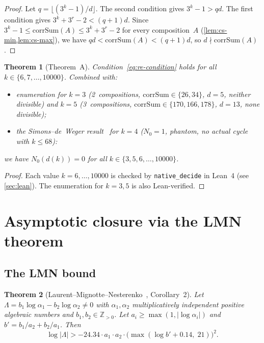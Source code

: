 \documentclass[11pt, a4paper]{amsart}
\theoremstyle{plain}
\newtheorem{theorem}{Theorem}[section]
\theoremstyle{definition}
\theoremstyle{remark}
\newcommand{\Z}{\mathbb{Z}}
\newcommand{\corrSum}{\mathrm{corrSum}}
\begin{document}
\begin{proof}
  Let $q = \lfloor (3^k - 1)/d \rfloor$.
  The second condition gives $3^k - 1 > qd$.
  The first condition gives $3^k + 3^r - 2 < (q+1)d$.
  Since $3^k - 1 \leq \corrSum(A) \leq 3^k + 3^r - 2$
  for every composition~$A$
  (\cref{lem:cs-min,lem:cs-max}), we have
  $qd < \corrSum(A) < (q+1)d$, so $d \nmid \corrSum(A)$.
\end{proof}

\begin{theorem}[Theorem~A]\label{thm:finite}
  Condition~\eqref{eq:re-condition} holds for all
  $k \in \{6, 7, \ldots, 10000\}$.
  Combined with:
  \begin{itemize}
    \item enumeration for $k = 3$ (2~compositions,
      $\corrSum \in \{26, 34\}$, $d = 5$, neither
      divisible) and $k = 5$ (3~compositions,
      $\corrSum \in \{170, 166, 178\}$, $d = 13$,
      none divisible);
    \item the Simons--de~Weger result~\cite{SimonsDeWeger2005}
      for $k = 4$ ($N_0 = 1$, phantom, no actual cycle
      with $k \leq 68$):
  \end{itemize}
  we have $N_0(d(k)) = 0$ for all
  $k \in \{3, 5, 6, \ldots, 10000\}$.
\end{theorem}

\begin{proof}
  Each value $k = 6, \ldots, 10000$ is checked by
  \texttt{native\_decide} in Lean~4 (see \cref{sec:lean}).
  The enumeration for $k = 3, 5$ is also Lean-verified.
\end{proof}

\section{Asymptotic closure via the LMN theorem}\label{sec:baker}

\subsection{The LMN bound}\label{ssec:lmn}

\begin{theorem}[Laurent--Mignotte--Nesterenko~\cite{LMN1995},
  Corollary~2]\label{thm:lmn}
  Let $\Lambda = b_1 \log \alpha_1 - b_2 \log \alpha_2 \neq 0$
  with $\alpha_1, \alpha_2$ multiplicatively independent positive
  algebraic numbers and $b_1, b_2 \in \Z_{>0}$.
  Let $a_i \geq \max(1, |\log \alpha_i|)$ and
  $b' = b_1/a_2 + b_2/a_1$.  Then
  \begin{equation}\label{eq:lmn-full}
    \log|\Lambda| > -24.34 \cdot a_1 \cdot a_2
    \cdot \bigl(\max(\log b' + 0.14,\; 21)\bigr)^2.
  \end{equation}
\end{theorem}
\end{document}
